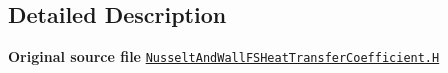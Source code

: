 \subsection{Detailed Description}
{\bfseries Original source file} \href{../../../home/carlo/data/GeN-Foam/GeN-Foam_ffn/GeN-Foam/GeN-Foam/classes/thermalHydraulics/src/physicsModels/heatTransferModels/FSHeatTransferCoefficientModels/NusseltAndWall/NusseltAndWallFSHeatTransferCoefficient.H}{\tt Nusselt\+And\+Wall\+F\+S\+Heat\+Transfer\+Coefficient.\+H} 